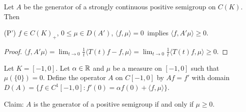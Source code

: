 \begin{lemma}\label{lem:b2-1.21}
Let $A$ be the generator of a strongly continuous positive semigroup on $C(K)$.
Then 

(P') \quad $f \in C(K)_{+}$,  $0 \leq \mu \in D(A')$,  $\langle f,\mu \rangle = 0$\, implies  $\langle f,A'\mu \rangle \geq 0$.
\end{lemma}
\begin{proof}
$\langle f,A'\mu \rangle = \lim_{t \to 0} \frac{1}{t} \langle T(t)f - f, \mu \rangle = \lim_{t \to 0} \frac{1}{t} \langle T(t)f, \mu \rangle \geq 0$.
\end{proof}
\begin{example}\label{ex:b2-1.22}
Let $K = [-1,0]$.
Let $\alpha \in \mathbb{R}$ and $\mu$ be a measure on $[-1,0]$ such that $\mu(\{0\}) = 0$.
Define the operator $A$ on $C[-1,0]$ by $Af = f'$ with domain $D(A) = \{f \in C^{1}[-1,0] \colon f'(0) = \alpha f(0) + \langle f,\mu \rangle\}$.

Claim: $A$ is the generator of a positive semigroup if and only if\/ $\mu \geq 0$.
\end{example}

